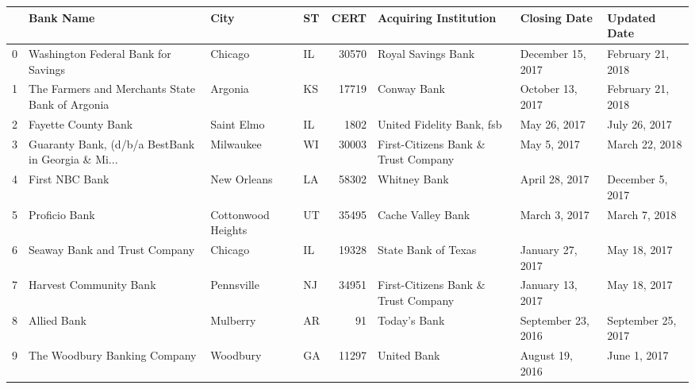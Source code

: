 \begin{tabular}{llllrlll}
\toprule
{} &                                          Bank Name &                City &  ST &   CERT &                              Acquiring Institution &        Closing Date &        Updated Date \\
\midrule
0   &                Washington Federal Bank for Savings &             Chicago &  IL &  30570 &                                 Royal Savings Bank &   December 15, 2017 &   February 21, 2018 \\
1   &    The Farmers and Merchants State Bank of Argonia &             Argonia &  KS &  17719 &                                        Conway Bank &    October 13, 2017 &   February 21, 2018 \\
2   &                                Fayette County Bank &          Saint Elmo &  IL &   1802 &                          United Fidelity Bank, fsb &        May 26, 2017 &       July 26, 2017 \\
3   &  Guaranty Bank, (d/b/a BestBank in Georgia \& Mi... &           Milwaukee &  WI &  30003 &                First-Citizens Bank \& Trust Company &         May 5, 2017 &      March 22, 2018 \\
4   &                                     First NBC Bank &         New Orleans &  LA &  58302 &                                       Whitney Bank &      April 28, 2017 &    December 5, 2017 \\
5   &                                      Proficio Bank &  Cottonwood Heights &  UT &  35495 &                                  Cache Valley Bank &       March 3, 2017 &       March 7, 2018 \\
6   &                      Seaway Bank and Trust Company &             Chicago &  IL &  19328 &                                State Bank of Texas &    January 27, 2017 &        May 18, 2017 \\
7   &                             Harvest Community Bank &          Pennsville &  NJ &  34951 &                First-Citizens Bank \& Trust Company &    January 13, 2017 &        May 18, 2017 \\
8   &                                        Allied Bank &            Mulberry &  AR &     91 &                                       Today's Bank &  September 23, 2016 &  September 25, 2017 \\
9   &                       The Woodbury Banking Company &            Woodbury &  GA &  11297 &                                        United Bank &     August 19, 2016 &        June 1, 2017 \\

\end{tabular}
